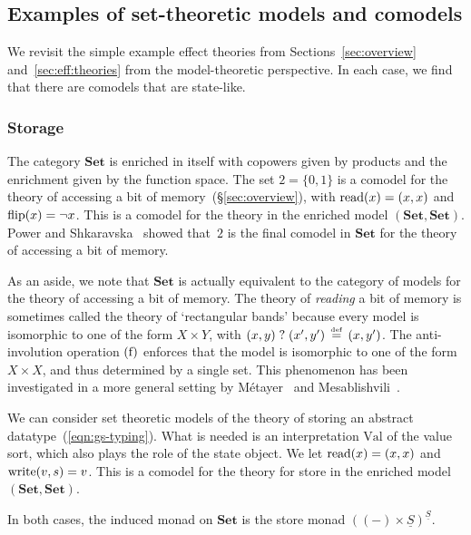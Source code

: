 \documentclass{LMCS}
\newcommand{\hide}[1]{}
\newcommand{\val}{\mathrm{Val}}
\newcommand{\VCat}{\fixedcatfont{V}} \newcommand{\CCat}{\fixedcatfont{C}} \newcommand{\DCat}{\fixedcatfont{D}}
\newcommand{\fixedcatfont}{\mathbf}
\newcommand{\stateobj}{{\underline{S}}}
\newcommand{\Set}{\mathbf{Set}}
\newcommand{\opcat}[1]{#1^{\mathrm{op}}}
\newcommand{\defeq}{\mathrel{\,\stackrel{\mbox{\tiny{$\mathrm{def}$}}}=\,}}
\begin{document}
\hide{In an enriched model $(\VCat,\CCat)$, 
we have a category $\CCat$ 
enriched in $\VCat$ with \emph{co}powers.
This means that $\opcat\CCat$ is enriched in $\VCat$ with powers. A \emph{comodel} in $\CCat$ is a model in $\opcat\CCat$. }


\subsection{Examples of set-theoretic models and comodels}
\label{sec:effmodels-example}
We revisit the simple example effect theories from
Sections~\ref{sec:overview} and~\ref{sec:eff:theories}
from the model-theoretic perspective.
In each case, we find that there are comodels that are state-like.
\subsubsection{Storage}
The category $\Set$ is enriched in itself with
copowers given by products and the enrichment given by 
the function space.
The set $2=\{0,1\}$ is a comodel for the theory of 
accessing a bit of memory~(\S\ref{sec:overview}),
with $\mathrm{read}(x)=(x,x)$ and $\mathrm{flip}(x)= \neg x$.
This is a comodel for the theory 
in the enriched model
$(\Set,\Set)$.  
Power and Shkaravska~\cite{Power:Shkaravska:04} showed that~$2$ is 
the final comodel in $\Set$ for the theory of accessing a bit of memory.

As an aside, we note that $\Set$ is actually equivalent to 
the category of models for the theory of accessing a bit of memory.
The theory of \emph{reading} a bit of memory is sometimes called the theory
of `rectangular bands' because 
every model is isomorphic to one of the form $X\times Y$,
with $\oread{(x,y)}{(x',y')}\defeq (x,y')$. 
The anti-involution operation $(\mathrm{f})$ enforces that the model is
isomorphic to 
one of the form $X\times X$, and thus determined by a single set.
This phenomenon has been investigated in a more general setting by 
M\'etayer~\cite{metayer-state} and Mesablishvili~\cite{mesablishvili-state}.

We can consider set theoretic models of 
the theory of storing an abstract datatype~(\ref{eqn:gs-typing}).
What is needed is an interpretation
$\val$ of the value sort,
which also plays the role of the state object.
We let 
$\mathrm{read}(x)=(x,x)$ and $\mathrm{write}(v,s)=v$.
This is a comodel for the theory for
store in the enriched model
$(\Set,\Set)$.  

In both cases, 
the induced monad on $\Set$ is 
the store monad $((-)\times\stateobj)^{\stateobj}$.
\end{document}
